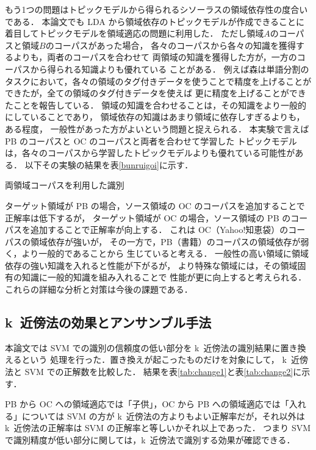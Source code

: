 \documentclass[japanese]{jnlp_1.4}
\begin{document}
もう1つの問題はトピックモデルから得られるシソーラスの領域依存性の度合いである．
本論文でも LDA から領域依存のトピックモデルが作成できることに
着目してトピックモデルを領域適応の問題に利用した．
ただし領域\( A \)のコーパスと領域\( B \)のコーパスがあった場合，
各々のコーパスから各々の知識を獲得するよりも，両者のコーパスを合わせて
両領域の知識を獲得した方が，一方のコーパスから得られる知識よりも優れている
ことがある．
例えば森は単語分割のタスクにおいて，各々の領域のタグ付きデータを使うことで精度を上げることが
できたが，全ての領域のタグ付きデータを使えば
更に精度を上げることができたことを報告している\cite{mori}．
領域の知識を合わせることは，その知識をより一般的にしていることであり，
領域依存の知識はあまり領域に依存しすぎるよりも，ある程度，
一般性があった方がよいという問題と捉えられる．
本実験で言えば PB のコーパスと OC のコーパスと両者を合わせて学習した
トピックモデルは，各々のコーパスから学習したトピックモデルよりも優れている可能性がある．
以下その実験の結果を\mbox{表\ref{bunruigoi}}に示す．

\begin{table}[t]
\caption{両領域コーパスを利用した識別}
\label{bunruigoi}

\end{table}

ターゲット領域が PB の場合，ソース領域の OC のコーパスを追加することで正解率は低下するが，
ターゲット領域が OC の場合，ソース領域の PB のコーパスを追加することで正解率が向上する．
これは OC（Yahoo!知恵袋）のコーパスの領域依存が強いが，
その一方で，PB（書籍）のコーパスの領域依存が弱く，より一般的であることから
生じていると考える．
一般性の高い領域に領域依存の強い知識を入れると性能が下がるが，
より特殊な領域には，その領域固有の知識に一般的知識を組み入れることで
性能が更に向上すると考えられる．これらの詳細な分析と対策は今後の課題である．



\subsection{k~近傍法の効果とアンサンブル手法}

本論文では SVM での識別の信頼度の低い部分を k~近傍法の識別結果に置き換えるという
処理を行った．置き換えが起こったものだけを対象にして，
k~近傍法と SVM での正解数を比較した．
結果を\mbox{表\ref{tab:change1}}と\mbox{表\ref{tab:change2}}に示す．

PB から OC への領域適応では「子供」，OC から PB への領域適応では「入れる」については
SVM の方が k~近傍法の方よりもよい正解率だが，それ以外は
k~近傍法の正解率は SVM の正解率と等しいかそれ以上であった．
つまり SVM で識別精度が低い部分に関しては，k~近傍法で識別する効果が確認できる．
\end{document}
